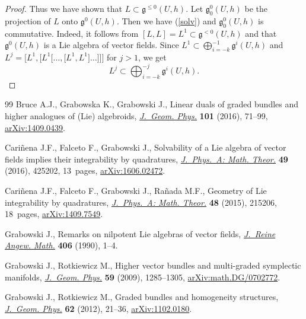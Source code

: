 \documentclass[11pt]{article}
\numberwithin{equation}{section}
\numberwithin{equation}{section}
\begin{document}
\begin{proof}
Thus we have shown that $L\subset\mathfrak{g}^{\le 0}(U,h)$. Let $\mathfrak{g}^{0}_0(U,h)$ be the projection of $L$ onto $\mathfrak{g}^{0}(U,h)$. Then we have (\ref{solv}) and $\mathfrak{g}^{0}_0(U,h)$ is commutative.
Indeed, it follows from $[L,L]=L^1\subset\mathfrak{g}^{< 0}(U,h)$ and that $\mathfrak{g}^{0}(U,h)$ is a Lie algebra of vector fields. Since $L^1\subset \bigoplus_{i=-k}^{-1}\mathfrak{g}^i(U,h)$ and $L^j=\big[L^1,\big[L^1\big[\dots,\big[L^1,L^1\big]\dots\big]\big]\big]$ for $j>1$, we get
\[L^j\subset \bigoplus_{i=-k}^{-j}\mathfrak{g}^i(U,h) .\tag*{\qed}\]
\renewcommand{\qed}{}
\end{proof}
\begin{thebibliography}{99}
Bruce A.J., Grabowska K., Grabowski J., Linear duals of graded bundles and
 higher analogues of ({L}ie) algebroids, \href{https://doi.org/10.1016/j.geomphys.2015.12.004}{\textit{J.~Geom. Phys.}} \textbf{101}
 (2016), 71--99, \href{https://arxiv.org/abs/1409.0439}{arXiv:1409.0439}.

Cari\~{n}ena J.F., Falceto F., Grabowski J., Solvability of a {L}ie algebra of
 vector fields implies their integrability by quadratures, \href{https://doi.org/10.1088/1751-8113/49/42/425202}{\textit{J.~Phys.~A:
 Math. Theor.}} \textbf{49} (2016), 425202, 13~pages, \href{https://arxiv.org/abs/1606.02472}{arXiv:1606.02472}.

Cari\~{n}ena J.F., Falceto F., Grabowski J., Ra\~{n}ada M.F., Geometry of {L}ie
 integrability by quadratures, \href{https://doi.org/10.1088/1751-8113/48/21/215206}{\textit{J.~Phys.~A: Math. Theor.}} \textbf{48}
 (2015), 215206, 18~pages, \href{https://arxiv.org/abs/1409.7549}{arXiv:1409.7549}.

Grabowski J., Remarks on nilpotent {L}ie algebras of vector fields,
 \href{https://doi.org/10.1515/crll.1990.406.1}{\textit{J.~Reine Angew. Math.}} \textbf{406} (1990), 1--4.

Grabowski J., Rotkiewicz M., Higher vector bundles and multi-graded symplectic
 manifolds, \href{https://doi.org/10.1016/j.geomphys.2009.06.009}{\textit{J.~Geom. Phys.}} \textbf{59} (2009), 1285--1305,
 \href{https://arxiv.org/abs/math.DG/0702772}{arXiv:math.DG/0702772}.

Grabowski J., Rotkiewicz M., Graded bundles and homogeneity structures,
 \href{https://doi.org/10.1016/j.geomphys.2011.09.004}{\textit{J.~Geom. Phys.}} \textbf{62} (2012), 21--36, \href{https://arxiv.org/abs/1102.0180}{arXiv:1102.0180}.


\end{thebibliography}
\end{document}
